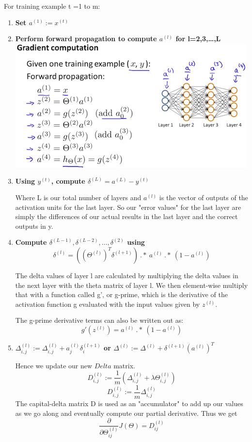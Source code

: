 \documentclass{report}
\begin{document}
For training example t =1 to m:
\begin{enumerate}
	\item \textbf{Set $a^{(1)} := x^{(t)}$}
	\item \textbf{Perform forward propagation to compute $a^{(l)}$ for l=2,3,…,L}\\
	\includegraphics[scale=0.65]{Forward_propagation.png}
	\item \textbf{Using $y^{(t)}$, compute $\delta^{(L)} = a^{(L)} - y^{(t)}$}
	
	Where L is our total number of layers and $a^{(l)}$ is the vector of outputs of the activation units for the last layer. So our "error values" for the last layer are simply the differences of our actual results in the last layer and the correct outputs in y.
	\item \textbf{Compute $\delta^{(L-1)}, \delta^{(L-2)},\dots,\delta^{(2)}$ using $$\delta^{(l)} = ((\Theta^{(l)})^T \delta^{(l+1)})\ .*\ a^{(l)}\ .*\ (1 - a^{(l)})$$}
	
	The delta values of layer l are calculated by multiplying the delta values in the next layer with the theta matrix of layer l. We then element-wise multiply that with a function called g', or g-prime, which is the derivative of the activation function g evaluated with the input values given by $z^{(l)}$.
	
	The g-prime derivative terms can also be written out as:
	$$g'(z^{(l)}) = a^{(l)}\ .*\ (1 - a^{(l)})$$
	\item \textbf{$\Delta^{(l)}_{i,j} := \Delta^{(l)}_{i,j} + a_j^{(l)} \delta_i^{(l+1)}$ or $\Delta^{(l)} := \Delta^{(l)} + \delta^{(l+1)}(a^{(l)})^T$}
	
	Hence we update our new $Delta$ matrix.
	$$D^{(l)}_{i,j} := \dfrac{1}{m}\left(\Delta^{(l)}_{i,j} + \lambda\Theta^{(l)}_{i,j}\right)$$
	$$D^{(l)}_{i,j} := \dfrac{1}{m}\Delta^{(l)}_{i,j}$$
	The capital-delta matrix D is used as an "accumulator" to add up our values as we go along and eventually compute our partial derivative. Thus we get $$\frac \partial {\partial \Theta_{ij}^{(l)}} J(\Theta) = D_{ij}^{(l)}$$
	
\end{enumerate}
\end{document}
